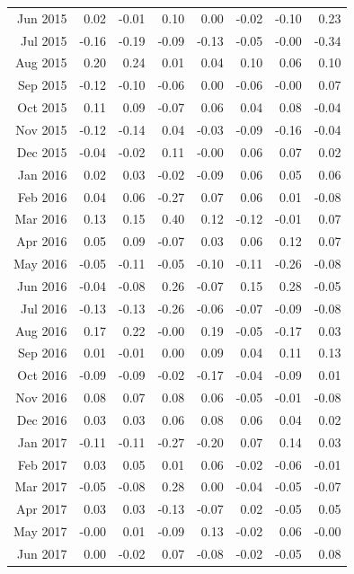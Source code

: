 \begin{tabularx}{\textwidth}{rrrrrrrr}
  Jun 2015 & 0.02 & -0.01 & 0.10 & 0.00 & -0.02 & -0.10 & 0.23 \\ 
  Jul 2015 & -0.16 & -0.19 & -0.09 & -0.13 & -0.05 & -0.00 & -0.34 \\ 
  Aug 2015 & 0.20 & 0.24 & 0.01 & 0.04 & 0.10 & 0.06 & 0.10 \\ 
  Sep 2015 & -0.12 & -0.10 & -0.06 & 0.00 & -0.06 & -0.00 & 0.07 \\ 
  Oct 2015 & 0.11 & 0.09 & -0.07 & 0.06 & 0.04 & 0.08 & -0.04 \\ 
  Nov 2015 & -0.12 & -0.14 & 0.04 & -0.03 & -0.09 & -0.16 & -0.04 \\ 
  Dec 2015 & -0.04 & -0.02 & 0.11 & -0.00 & 0.06 & 0.07 & 0.02 \\ 
  Jan 2016 & 0.02 & 0.03 & -0.02 & -0.09 & 0.06 & 0.05 & 0.06 \\ 
  Feb 2016 & 0.04 & 0.06 & -0.27 & 0.07 & 0.06 & 0.01 & -0.08 \\ 
  Mar 2016 & 0.13 & 0.15 & 0.40 & 0.12 & -0.12 & -0.01 & 0.07 \\ 
  Apr 2016 & 0.05 & 0.09 & -0.07 & 0.03 & 0.06 & 0.12 & 0.07 \\ 
  May 2016 & -0.05 & -0.11 & -0.05 & -0.10 & -0.11 & -0.26 & -0.08 \\ 
  Jun 2016 & -0.04 & -0.08 & 0.26 & -0.07 & 0.15 & 0.28 & -0.05 \\ 
  Jul 2016 & -0.13 & -0.13 & -0.26 & -0.06 & -0.07 & -0.09 & -0.08 \\ 
  Aug 2016 & 0.17 & 0.22 & -0.00 & 0.19 & -0.05 & -0.17 & 0.03 \\ 
  Sep 2016 & 0.01 & -0.01 & 0.00 & 0.09 & 0.04 & 0.11 & 0.13 \\ 
  Oct 2016 & -0.09 & -0.09 & -0.02 & -0.17 & -0.04 & -0.09 & 0.01 \\ 
  Nov 2016 & 0.08 & 0.07 & 0.08 & 0.06 & -0.05 & -0.01 & -0.08 \\ 
  Dec 2016 & 0.03 & 0.03 & 0.06 & 0.08 & 0.06 & 0.04 & 0.02 \\ 
  Jan 2017 & -0.11 & -0.11 & -0.27 & -0.20 & 0.07 & 0.14 & 0.03 \\ 
  Feb 2017 & 0.03 & 0.05 & 0.01 & 0.06 & -0.02 & -0.06 & -0.01 \\ 
  Mar 2017 & -0.05 & -0.08 & 0.28 & 0.00 & -0.04 & -0.05 & -0.07 \\ 
  Apr 2017 & 0.03 & 0.03 & -0.13 & -0.07 & 0.02 & -0.05 & 0.05 \\ 
  May 2017 & -0.00 & 0.01 & -0.09 & 0.13 & -0.02 & 0.06 & -0.00 \\ 
  Jun 2017 & 0.00 & -0.02 & 0.07 & -0.08 & -0.02 & -0.05 & 0.08 \\ 

\end{tabularx}

